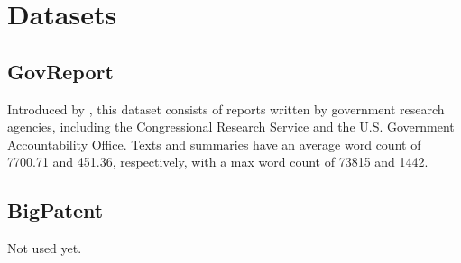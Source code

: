 \section{Datasets}


\subsection*{GovReport}

Introduced by \citet{huang-etal-2021-efficient}, this dataset consists of
reports written by government research agencies, including the Congressional
Research Service and the U.S. Government Accountability Office.
Texts and summaries have an average word count of 7700.71 and 451.36,
respectively, with a max word count of 73815 and 1442.


\subsection*{BigPatent}

Not used yet. \nocite{sharma-etal-2019-bigpatent}
